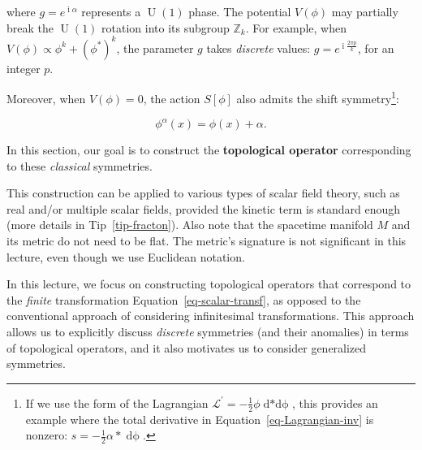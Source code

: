 \documentclass[
  letterpaper,
  DIV=11,
  numbers=noendperiod]{scrreport}
\DeclareMathOperator{\U}{U}
\DeclareMathOperator{\imunit}{i}
\begin{document}
where \(g=e^{\imunit \alpha}\) represents a \(\U(1)\) phase. The
potential \(V(\phi)\) may partially break the \(\U(1)\) rotation into
its subgroup \(\mathbb{Z}_k\). For example, when
\(V(\phi)\propto \phi^k+(\phi^*)^k\), the parameter \(g\) takes
\emph{discrete} values: \(g = e^{\imunit \frac{2\pi p}{k}}\), for an
integer \(p\).

Moreover, when \(V(\phi)=0\), the action \(S[\phi]\) also admits the
shift symmetry\footnote{If we use the form of the Lagrangian
  \(\mathcal{L}^\prime= -\frac12 \phi \mathop{d*d\phi}\), this provides
  an example where the total derivative in
  Equation~\ref{eq-Lagrangian-inv} is nonzero:
  \(s=-\frac12 \alpha \mathop{*}\mathop{d\phi}\).}:

\[
\phi^{\alpha}(x) = \phi(x) + \alpha.
\]

In this section, our goal is to construct the \textbf{topological
operator} corresponding to these \emph{classical} symmetries.

\begin{tcolorbox}[enhanced jigsaw, opacityback=0, colback=white, colframe=quarto-callout-note-color-frame, title=\textcolor{quarto-callout-note-color}{\faInfo}\hspace{0.5em}{Note}, breakable, coltitle=black, arc=.35mm, opacitybacktitle=0.6, bottomrule=.15mm, bottomtitle=1mm, left=2mm, toprule=.15mm, titlerule=0mm, rightrule=.15mm, leftrule=.75mm, toptitle=1mm, colbacktitle=quarto-callout-note-color!10!white]

This construction can be applied to various types of scalar field
theory, such as real and/or multiple scalar fields, provided the kinetic
term is standard enough (more details in Tip~\ref{tip-fracton}). Also
note that the spacetime manifold \(M\) and its metric do not need to be
flat. The metric's signature is not significant in this lecture, even
though we use Euclidean notation.

\end{tcolorbox}

\begin{tcolorbox}[enhanced jigsaw, opacityback=0, colback=white, colframe=quarto-callout-note-color-frame, title=\textcolor{quarto-callout-note-color}{\faInfo}\hspace{0.5em}{Note}, breakable, coltitle=black, arc=.35mm, opacitybacktitle=0.6, bottomrule=.15mm, bottomtitle=1mm, left=2mm, toprule=.15mm, titlerule=0mm, rightrule=.15mm, leftrule=.75mm, toptitle=1mm, colbacktitle=quarto-callout-note-color!10!white]

In this lecture, we focus on constructing topological operators that
correspond to the \emph{finite} transformation
Equation~\ref{eq-scalar-transf}, as opposed to the conventional approach
of considering infinitesimal transformations. This approach allows us to
explicitly discuss \emph{discrete} symmetries (and their anomalies) in
terms of topological operators, and it also motivates us to consider
generalized symmetries.

\end{tcolorbox}
\end{document}
